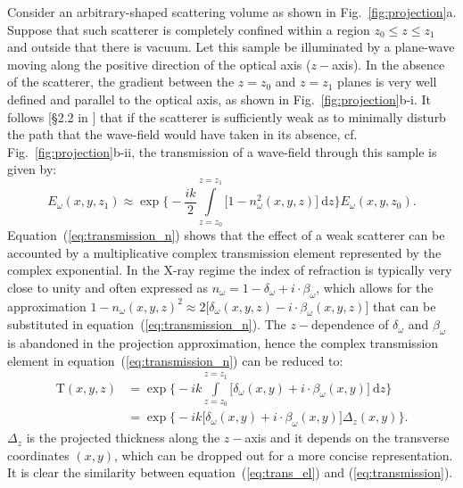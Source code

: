 \documentclass{iucr}              %
\begin{document}
Consider an arbitrary-shaped scattering volume as shown in Fig.~\ref{fig:projection}a. Suppose that such scatterer is completely confined within a region $z_0\leq z\leq z_1$ and outside that there is vacuum. Let this sample be illuminated by a plane-wave moving along the positive direction of the optical axis ($z-$axis). In the absence of the scatterer, the gradient between the $z=z_0$ and $z=z_1$ planes is very well defined and parallel to the optical axis, as shown in Fig.~\ref{fig:projection}b-$\mathrm{i}$. It follows [§2.2 in  \cite{paganin_book}] that if the scatterer is sufficiently weak as to minimally disturb the path that the wave-field would have taken in its absence, cf. Fig.~\ref{fig:projection}b-$\mathrm{ii}$, the transmission of a wave-field through this sample is given by:
\begin{equation}\label{eq:transmission_n}
    E_\omega(x,y,z_1)\approx\exp\Bigg\{-\frac{ik}{2}\int\limits_{z=z_0}^{z=z_1}{\big[1-n_\omega^2(x,y,z)\big]~\mathrm{d}z}\Bigg\}E_\omega(x,y,z_0).
\end{equation}{}
Equation~(\ref{eq:transmission_n}) shows that the effect of a weak scatterer can be accounted by a multiplicative complex transmission element represented by the complex exponential. In the X-ray regime the index of refraction is typically very close to unity and often expressed as $n_\omega=1-\delta_\omega+i\cdot\beta_\omega$, which allows for the approximation $1-n_\omega(x,y,z)^2\approx2\big[\delta_\omega(x,y,z)-i\cdot\beta_\omega(x,y,z)\big]$ that can be substituted in equation~(\ref{eq:transmission_n}). The $z-$dependence of $\delta_\omega$ and $\beta_\omega$ is abandoned in the projection approximation, hence the complex transmission element in equation~(\ref{eq:transmission_n}) can be reduced to:
\begin{align}\label{eq:transmission}
\mathrm{T}(x,y,z) &=\exp\Bigg\{-ik\int\limits_{z=z_0}^{z=z_1}{\big[\delta_\omega(x,y)+i\cdot\beta_\omega(x,y)\big]~\mathrm{d}z}\Bigg\}\nonumber\\
         &=\exp\Bigg\{-ik\big[\delta_\omega(x,y)+i\cdot\beta_\omega(x,y)\big]\Delta_z(x,y)\Bigg\}.
\end{align}{}
$\Delta_z$ is the projected thickness along the $z-$axis and it depends on the transverse coordinates $(x,y)$, which can be dropped out for a more concise representation. It is clear the similarity between equation~(\ref{eq:trans_el}) and (\ref{eq:transmission}).
\end{document}
